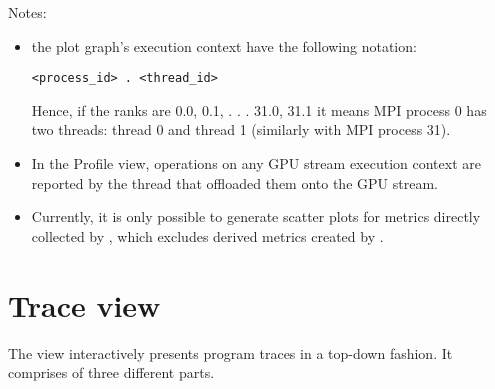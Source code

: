 \documentclass[english]{article}
\begin{document}
Notes:
\begin{itemize}
        \item the plot graph’s execution context have the following notation:
\begin{verbatim}
<process_id> . <thread_id>
\end{verbatim}
        Hence, if the ranks are 0.0, 0.1, . . . 31.0, 31.1 it means MPI process 0 has two threads:
thread 0 and thread 1 (similarly with MPI process 31).
        \item In the Profile view, operations on any GPU stream execution context are reported by the thread that offloaded them onto the GPU stream.
        \item Currently, it is only possible to generate scatter plots for metrics directly collected by
, which excludes derived metrics created by .
\end{itemize}




\section{Trace view}

The view interactively presents program traces in a top-down fashion.
It comprises of three different parts.
\end{document}
